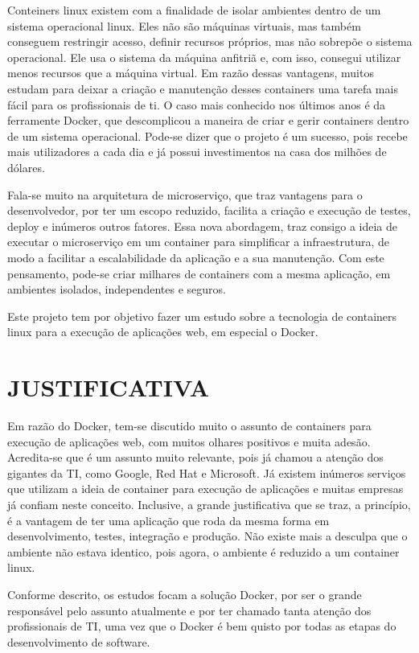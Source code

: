 \documentclass[
	12pt,				%
	openright,			%
	oneside,			%
	a4paper,			%
	chapter=TITLE,		%
	section=TITLE,		%
	english,			%
	french,				%
	spanish,			%
	brazil				%
	]{abntex2}
\begin{document}
Conteiners linux existem com a finalidade de isolar ambientes dentro de um sistema operacional linux. Eles não são máquinas virtuais, mas também conseguem restringir acesso, definir recursos próprios, mas não sobrepõe o sistema operacional. Ele usa o sistema da máquina anfitriã e, com isso, consegui utilizar menos recursos que a máquina virtual. Em razão dessas vantagens, muitos estudam para deixar a criação e manutenção desses containers uma tarefa mais fácil para os profissionais de ti. O caso mais conhecido nos últimos anos é da ferramente Docker, que descomplicou a maneira de criar e gerir containers dentro de um sistema operacional. Pode-se dizer que o projeto é um sucesso, pois recebe mais utilizadores a cada dia e já possui investimentos na casa dos milhões de dólares.

Fala-se muito na arquitetura de microserviço, que traz vantagens para o desenvolvedor, por ter um escopo reduzido, facilita a criação e execução de testes, deploy e inúmeros outros fatores. Essa nova abordagem, traz consigo a ideia de executar o microserviço em um container para simplificar a infraestrutura, de modo a facilitar a escalabilidade da aplicação e a sua manutenção. Com este pensamento, pode-se criar milhares de containers com a mesma aplicação, em ambientes isolados, independentes e seguros.

Este projeto tem por objetivo fazer um estudo sobre a tecnologia de containers linux para a execução de aplicações web, em especial o Docker.


\section{JUSTIFICATIVA}

Em razão do Docker, tem-se discutido muito o assunto de containers para execução de aplicações web, com muitos olhares positivos e muita adesão. Acredita-se que é um assunto muito relevante, pois já chamou a atenção dos gigantes da TI, como Google, Red Hat e Microsoft. Já existem inúmeros serviços que utilizam a ideia de container para execução de aplicações e muitas empresas já confiam neste conceito. Inclusive, a grande justificativa que se traz, a princípio, é a vantagem de ter uma aplicação que roda da mesma forma em desenvolvimento, testes, integração e produção. Não existe mais a desculpa que o ambiente não estava identico, pois agora, o ambiente é reduzido a um container linux.

Conforme descrito, os estudos focam a solução Docker, por ser o grande responsável pelo assunto atualmente e por ter chamado tanta atenção dos profissionais de TI, uma vez que o Docker é bem quisto por todas as etapas do desenvolvimento de software.
\end{document}
